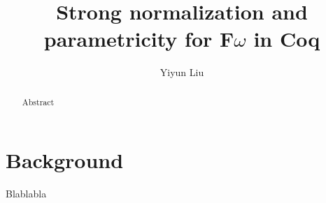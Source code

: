 \documentclass[acmsmall, nonacm=true]{acmart}
\title{Strong normalization and parametricity for F$\omega$ in Coq}
\author{Yiyun Liu}
\affiliation{%
  \institution{University of Pennsylvania}
  \city{Philadelphia}
  \country{USA}
}
\begin{document}
\begin{abstract}
  Abstract
\end{abstract}

\maketitle

\section{Background}
Blablabla

\end{document}
